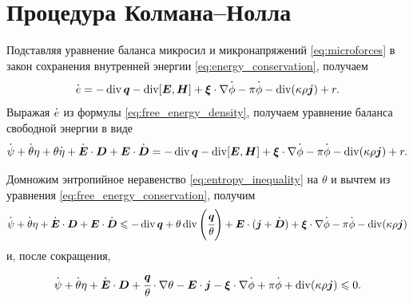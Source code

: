 
\section{Процедура Колмана--Нолла}

Подставляя уравнение баланса микросил и микронапряжений \eqref{eq:microforces} в закон сохранения внутренней энергии \eqref{eq:energy_conservation}, получаем
\[
    \dt{e} = -\Div \vq - \Div[\vE, \vect{H}] + \vxi \cdot \nabla \dt{\phi} - \pi \dt{\phi} - \Div(\kappa \rho \vj) + r.
\]
Выражая $\dt{e}$ из формулы \eqref{eq:free_energy_density}, получаем уравнение баланса свободной энергии в виде
\begin{equation}
    \dt{\psi} + \dt{\theta} \eta + \theta \dt{\eta} + \dt{\vE} \cdot \vD + \vE \cdot \dt{\vD} = -\Div \vq - \Div[\vE, \vect{H}] + \vxi \cdot \nabla \dt{\phi} - \pi \dt{\phi} - \Div(\kappa \rho \vj) + r.
    \label{eq:free_energy_conservation}
\end{equation}

Домножим энтропийное неравенство \eqref{eq:entropy_inequality} на $\theta$ и вычтем из уравнения \eqref{eq:free_energy_conservation}, получим
\[
    \dt{\psi} + \dt{\theta} \eta + \dt{\vE} \cdot \vD + \vE \cdot \dt{\vD} \leqslant -\Div \vq + \theta \Div \left( \cfrac{\vq}{\theta} \right) + \vE \cdot (\vj + \dt{\vD}) + \vxi \cdot \nabla \dt{\phi} - \pi \dt{\phi} - \Div(\kappa \rho \vj)
\]
и, после сокращения,
\begin{equation}
    \dt{\psi} + \dt{\theta} \eta + \dt{\vE} \cdot \vD + \cfrac{\vq}{\theta} \cdot \nabla \theta - \vE \cdot \vj - \vxi \cdot \nabla \dt{\phi} + \pi \dt{\phi} + \Div(\kappa \rho \vj) \leqslant 0.
    \label{eq:free_energy_inequality}
\end{equation}

